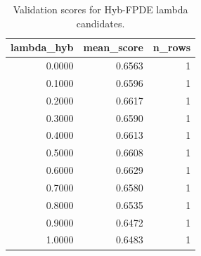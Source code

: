 \begin{table}[t]
\caption{Validation scores for Hyb-FPDE lambda candidates.}
\label{tab:lambda_distribution_computed}
\centering
\begin{tabular}{rrr}
\toprule
lambda\_hyb & mean\_score & n\_rows \\
\midrule
0.0000 & 0.6563 & 1 \\
0.1000 & 0.6596 & 1 \\
0.2000 & 0.6617 & 1 \\
0.3000 & 0.6590 & 1 \\
0.4000 & 0.6613 & 1 \\
0.5000 & 0.6608 & 1 \\
0.6000 & 0.6629 & 1 \\
0.7000 & 0.6580 & 1 \\
0.8000 & 0.6535 & 1 \\
0.9000 & 0.6472 & 1 \\
1.0000 & 0.6483 & 1 \\
\bottomrule
\end{tabular}

\end{table}
